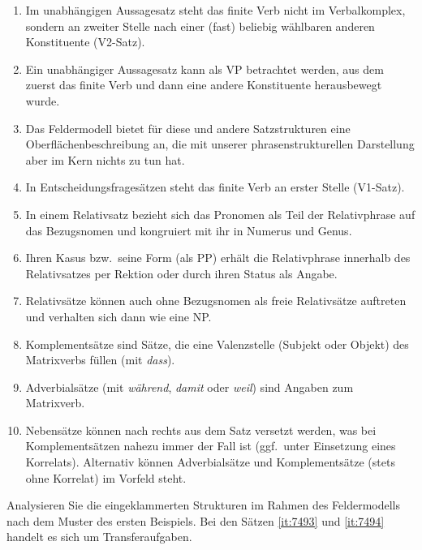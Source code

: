 \begin{enumerate}
  \item Im unabhängigen Aussagesatz steht das finite Verb nicht im Verbalkomplex, sondern an zweiter Stelle nach einer (fast) beliebig wählbaren anderen Konstituente (V2-Satz).
  \item Ein unabhängiger Aussagesatz kann als VP betrachtet werden, aus dem zuerst das finite Verb und dann eine andere Konstituente herausbewegt wurde.
  \item Das Feldermodell bietet für diese und andere Satzstrukturen eine Oberflächenbeschreibung an, die mit unserer phrasenstrukturellen Darstellung aber im Kern nichts zu tun hat.
  \item In Entscheidungsfragesätzen steht das finite Verb an erster Stelle (V1-Satz).
  \item In einem Relativsatz bezieht sich das Pronomen als Teil der Relativphrase auf das Bezugsnomen und kongruiert mit ihr in Numerus und Genus.
  \item Ihren Kasus bzw.\ seine Form (\zB als PP) erhält die Relativphrase innerhalb des Relativsatzes per Rektion oder durch ihren Status als Angabe.
  \item Relativsätze können auch ohne Bezugsnomen als freie Relativsätze auftreten und verhalten sich dann wie eine NP.
  \item Komplementsätze sind Sätze, die eine Valenzstelle (Subjekt oder Objekt) des Matrixverbs füllen (\zB mit \textit{dass}).
  \item Adverbialsätze (\zB mit \textit{während}, \textit{damit} oder \textit{weil}) sind Angaben zum Matrixverb.
  \item Nebensätze können nach rechts aus dem Satz versetzt werden, was bei Komplementsätzen nahezu immer der Fall ist (ggf.\ unter Einsetzung eines Korrelats).
    Alternativ können Adverbialsätze und Komplementsätze (stets ohne Korrelat) im Vorfeld steht.
\end{enumerate}

\Uebungen

\Uebung \label{u121} Analysieren Sie die eingeklammerten Strukturen im Rahmen des Feldermodells nach dem Muster des ersten Beispiels.
Bei den Sätzen \ref{it:7493} und \ref{it:7494} handelt es sich um Transferaufgaben.

